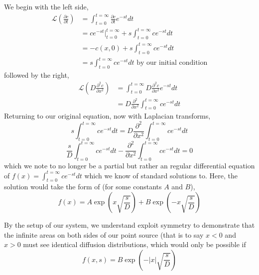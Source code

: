 We begin with the left side,
\begin{align*}
    \mathcal{L} \left(\frac{\partial c}{\partial t}\right) &= \int_{t=0}^{t=\infty} \frac{\partial c}{\partial t} e^{-st} dt\\
    &= c e^{-st} |_{t=0}^{t=\infty} + s \int_{t=0}^{t=\infty} ce^{-st} dt \\
    &= -c(x,0) + s \int_{t=0}^{t=\infty} ce^{-st} dt \\
    &= s \int_{t=0}^{t=\infty} ce^{-st} dt \text{ by our initial condition}
\end{align*}
followed by the right,
\begin{align*}
    \mathcal{L} \left(D \frac{\partial^2 c}{\partial x^2}\right) &= \int_{t=0}^{t=\infty} D \frac{\partial^2 c}{\partial x^2} e^{-st} dt\\
    &=  D \frac{\partial^2}{\partial x^2}  \int_{t=0}^{t=\infty} ce^{-st} dt
\end{align*}
Returning to our original equation, now with Laplacian transforms,
    $$s \int_{t=0}^{t=\infty} ce^{-st} dt = D \frac{\partial^2}{\partial x^2}  \int_{t=0}^{t=\infty} ce^{-st} dt$$
    $$\frac{s}{D} \int_{t=0}^{t=\infty} ce^{-st} dt - \frac{\partial^2}{\partial x^2}  \int_{t=0}^{t=\infty} ce^{-st} dt = 0$$
which we note to no longer be a partial but rather an regular differential equation of $f(x) = \int_{t=0}^{t=\infty} ce^{-st} dt$ which we know of standard solutions to.
Here, the solution would take the form of (for some constants $A$ and $B$),
$$f(x) = A\exp\left(x\sqrt{\frac{s}{D}}\right)+B\exp\left(-x\sqrt{\frac{s}{D}}\right)$$

By the setup of our system, we understand exploit symmetry to demonstrate that the infinite areas on both sides of our point source (that is to say $x<0$ and $x>0$ must see identical diffusion distributions, which would only be possible if
$$f(x,s) = B\exp\left(-|x|\sqrt{\frac{s}{D}}\right)$$

